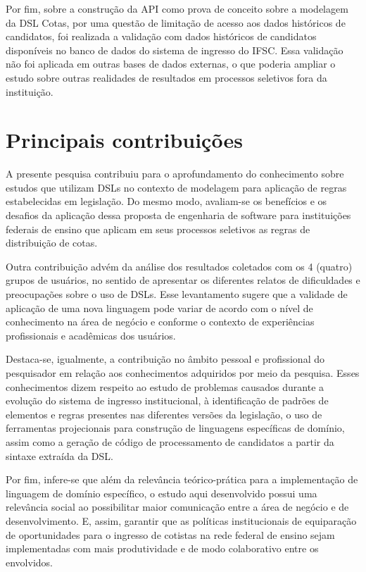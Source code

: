 Por fim, sobre a construção da API como prova de conceito sobre a modelagem da DSL Cotas, por uma questão de limitação de acesso aos dados históricos de candidatos, foi realizada a validação com dados históricos de candidatos disponíveis no banco de dados do sistema de ingresso do \gls{IFSC}. Essa validação não foi aplicada em outras bases de dados externas, o que poderia ampliar o estudo sobre outras realidades de resultados em processos seletivos fora da instituição.

\section{Principais contribuições}
\label{principaiscontribuicoes}

A presente pesquisa contribuiu para o aprofundamento do conhecimento sobre estudos que utilizam \gls{DSL}s no contexto de modelagem para aplicação de regras estabelecidas em legislação. Do mesmo modo, avaliam-se os benefícios e os desafios da aplicação dessa proposta de engenharia de software para instituições federais de ensino que aplicam em seus processos seletivos as regras de distribuição de cotas. 

Outra contribuição advém da análise dos resultados coletados com os 4 (quatro) grupos de usuários, no sentido de apresentar os diferentes relatos de dificuldades e preocupações sobre o uso de DSLs. Esse levantamento sugere que a validade de aplicação de uma nova linguagem pode variar de acordo com o nível de conhecimento na área de negócio e conforme o contexto de experiências profissionais e acadêmicas dos usuários.

Destaca-se, igualmente, a contribuição no âmbito pessoal e profissional do pesquisador em relação aos conhecimentos adquiridos por meio da pesquisa. Esses conhecimentos dizem respeito ao estudo de problemas causados durante a evolução do sistema de ingresso institucional, à identificação de padrões de elementos e regras presentes nas diferentes versões da legislação, o uso de ferramentas projecionais para construção de linguagens específicas de domínio, assim como a geração de código de processamento de candidatos a partir da sintaxe extraída da DSL.

Por fim, infere-se que além da relevância teórico-prática para a implementação de linguagem de domínio específico, o estudo aqui desenvolvido possui uma relevância social ao possibilitar maior comunicação entre a área de negócio e de desenvolvimento. E, assim, garantir que as políticas institucionais de equiparação de oportunidades para o ingresso de cotistas na rede federal de ensino sejam implementadas com mais produtividade e de modo colaborativo entre os envolvidos.   

